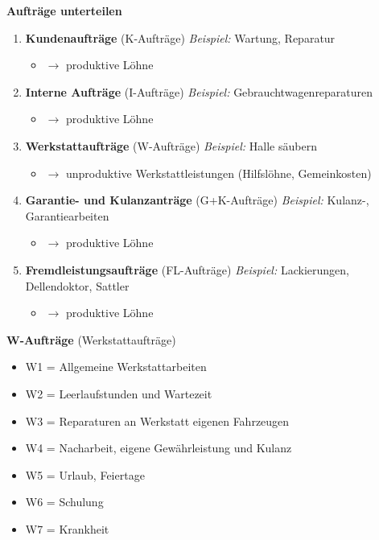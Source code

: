 \textbf{Aufträge unterteilen}

\begin{enumerate}
\item
  \textbf{Kundenaufträge} (K-Aufträge) \emph{Beispiel:} Wartung,
  Reparatur

  \begin{itemize}
  \item
    $\to$ produktive Löhne
  \end{itemize}
\item
  \textbf{Interne Aufträge} (I-Aufträge) \emph{Beispiel:}
  Gebrauchtwagenreparaturen

  \begin{itemize}
  \item
    $\to$ produktive Löhne
  \end{itemize}
\item
  \textbf{Werkstattaufträge} (W-Aufträge) \emph{Beispiel:} Halle säubern

  \begin{itemize}
  \item
    $\to$ unproduktive Werkstattleistungen (Hilfslöhne, Gemeinkosten)
  \end{itemize}
\item
  \textbf{Garantie- und Kulanzanträge} (G+K-Aufträge) \emph{Beispiel:}
  Kulanz-, Garantiearbeiten

  \begin{itemize}
  \item
    $\to$ produktive Löhne
  \end{itemize}
\item
  \textbf{Fremdleistungsaufträge} (FL-Aufträge) \emph{Beispiel:}
  Lackierungen, Dellendoktor, Sattler

  \begin{itemize}
  \item
    $\to$ produktive Löhne
  \end{itemize}
\end{enumerate}

\textbf{W-Aufträge} (Werkstattaufträge)

\begin{itemize}
\item
  W1 = Allgemeine Werkstattarbeiten
\item
  W2 = Leerlaufstunden und Wartezeit
\item
  W3 = Reparaturen an Werkstatt eigenen Fahrzeugen
\item
  W4 = Nacharbeit, eigene Gewährleistung und Kulanz
\item
  W5 = Urlaub, Feiertage
\item
  W6 = Schulung
\item
  W7 = Krankheit
\end{itemize}

